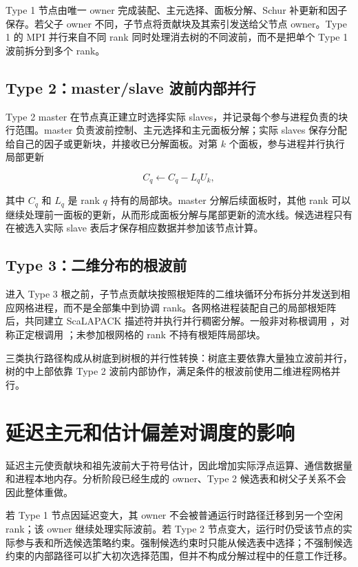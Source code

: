 Type 1 节点由唯一 owner 完成装配、主元选择、面板分解、Schur 补更新和因子保存。若父子 owner 不同，子节点将贡献块及其索引发送给父节点 owner。Type 1 的 MPI 并行来自不同 rank 同时处理消去树的不同波前，而不是把单个 Type 1 波前拆分到多个 rank。

\subsection{Type 2：master/slave 波前内部并行}

Type 2 master 在节点真正建立时选择实际 slaves，并记录每个参与进程负责的块行范围。master 负责波前控制、主元选择和主元面板分解；实际 slaves 保存分配给自己的因子或更新块，并接收已分解面板。对第 $k$ 个面板，参与进程并行执行局部更新

\[
C_q\leftarrow C_q-L_qU_k,
\]

其中 $C_q$ 和 $L_q$ 是 rank $q$ 持有的局部块。master 分解后续面板时，其他 rank 可以继续处理前一面板的更新，从而形成面板分解与尾部更新的流水线。候选进程只有在被选入实际 slave 表后才保存相应数据并参加该节点计算。

\subsection{Type 3：二维分布的根波前}

进入 Type 3 根之前，子节点贡献块按照根矩阵的二维块循环分布拆分并发送到相应网格进程，而不是全部集中到协调 rank。各网格进程装配自己的局部根矩阵后，共同建立 ScaLAPACK 描述符并执行并行稠密分解。一般非对称根调用 ，对称正定根调用 ；未参加根网格的 rank 不持有根矩阵局部块。

三类执行路径构成从树底到树根的并行性转换：树底主要依靠大量独立波前并行，树的中上部依靠 Type 2 波前内部协作，满足条件的根波前使用二维进程网格并行。

\section{延迟主元和估计偏差对调度的影响}

延迟主元使贡献块和祖先波前大于符号估计，因此增加实际浮点运算、通信数据量和进程本地内存。分析阶段已经生成的 owner、Type 2 候选表和树父子关系不会因此整体重做。

若 Type 1 节点因延迟变大，其 owner 不会被普通运行时路径迁移到另一个空闲 rank；该 owner 继续处理实际波前。若 Type 2 节点变大，运行时仍受该节点的实际参与表和所选候选策略约束。强制候选约束时只能从候选表中选择；不强制候选约束的内部路径可以扩大初次选择范围，但并不构成分解过程中的任意工作迁移。

